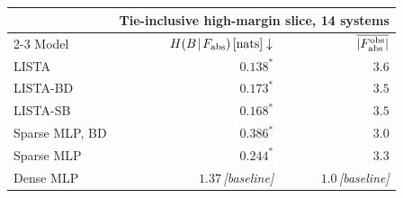 \begin{tabular}[t]{@{}l rr@{}}
\toprule
& \multicolumn{2}{c}{Tie-inclusive high-margin slice, 14 systems} \\
\cmidrule(l){2-3}
Model & $H(B\!\mid\!F_{\rm abs})\,[\mathrm{nats}]\downarrow$ & $\overline{|F_{\rm abs}^{\rm obs}|}$ \\
\midrule
LISTA & ${\mathbf{0.138}}^{\ast}$ & $\mathbf{3.6}$ \\
LISTA-BD & ${0.173}^{\ast}$ & $3.5$ \\
LISTA-SB & ${0.168}^{\ast}$ & $3.5$ \\
Sparse MLP, BD & ${0.386}^{\ast}$ & $3.0$ \\
Sparse MLP & ${0.244}^{\ast}$ & $3.3$ \\
\midrule
Dense MLP & $1.37$\,\emph{[baseline]} & $1.0$\,\emph{[baseline]} \\
\bottomrule
\end{tabular}
